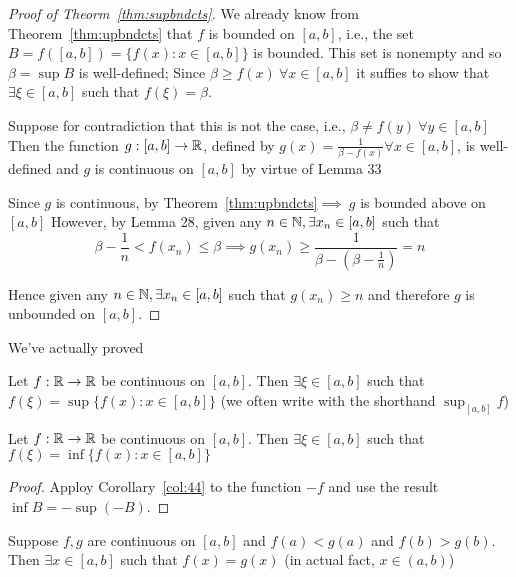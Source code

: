 \begin{proof}[Proof of Theorm~\ref{thm:supbndcts}]
    We already know from Theorem~\ref{thm:upbndcts} that $f$ is bounded on $\left[a, b\right]$,
    i.e., the set $B = f(\left[a, b\right]) = \{f(x): x \in \left[a, b\right]\}$ is bounded.
    This set is nonempty and so $\beta = \sup B$ is well-defined;
    Since $\beta \geq f(x)\ \forall x \in \left[a, b\right]$ it suffies to show that
    $\exists \xi \in \left[a, b\right]$ such that $f(\xi) = \beta$.
    
    Suppose for contradiction that this is not the case, i.e., 
    $\beta \neq f(y)\ \forall y \in \left[a, b\right]$ Then the function $g: \left[a, b\right] \to \mathbb R$,
    defined by $g(x) = \frac{1}{\beta - f(x)} \forall x \in \left[a, b\right]$,
    is well-defined and $g$ is continuous on $\left[a, b\right]$ by virtue of Lemma 33

    Since $g$ is continuous, by Theorem~\ref{thm:upbndcts}$\implies\ g$ is bounded above on $\left[a, b\right]$
    However, by Lemma 28, given any $n \in \mathbb N, \exists x_n \in \left[a, b\right]$ such that 
    $$\beta - \frac{1}{n} < f(x_n)\leq \beta \implies g(x_n) \geq \frac{1}{\beta - \left(\beta-\frac{1}{n}\right)} = n$$ 

    Hence given any $n \in \mathbb N, \exists x_n \in \left[a, b\right]$ such that $g(x_n) \geq n$ and
    therefore $g$ is unbounded on $\left[a, b\right]$.
\end{proof}

We've actually proved
\begin{corollary}\label{col:44}
    Let $f: \mathbb R \to \mathbb R$ be continuous on $\left[a, b\right]$. Then $\exists\xi \in \left[a, b\right]$ such that
    $f(\xi) = \sup\{f(x) : x \in \left[a, b\right]\}$ (we often write with the shorthand $\sup_{\left[a, b\right]} f$)
\end{corollary}

\begin{corollary}
    Let $f: \mathbb R \to \mathbb R$ be continuous on $\left[a, b\right]$. Then $\exists \xi \in \left[a, b\right]$ such that
    $f(\xi) = \inf\{f(x) : x \in \left[a, b\right]\}$ 
\end{corollary}

\begin{proof}
    Apploy Corollary~\ref{col:44} to the function $-f$ and use the result $\inf B = -\sup(-B)$.
\end{proof}

\begin{example}
    Suppose $f, g$ are continuous on $\left[a, b\right]$ and $f(a) < g(a)$ and $f(b) > g(b)$.
    Then $\exists x \in \left[a, b\right]$ such that $f(x) = g(x)$ (in actual fact, $x \in (a, b)$)
\end{example}

